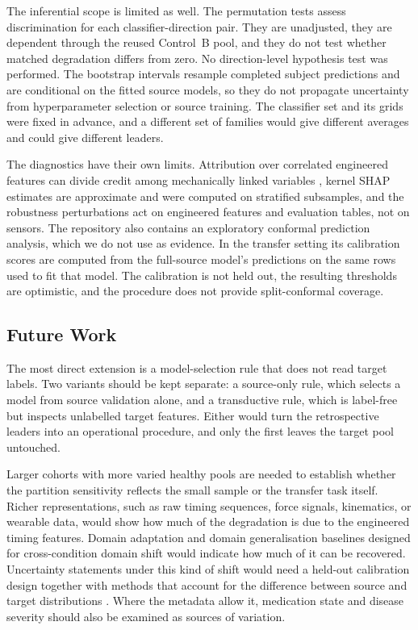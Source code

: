 \documentclass[conference]{IEEEtran}
\begin{document}
The inferential scope is limited as well. The permutation tests assess discrimination for each classifier-direction pair. They are unadjusted, they are dependent through the reused Control~B pool, and they do not test whether matched degradation differs from zero. No direction-level hypothesis test was performed. The bootstrap intervals resample completed subject predictions and are conditional on the fitted source models, so they do not propagate uncertainty from hyperparameter selection or source training. The classifier set and its grids were fixed in advance, and a different set of families would give different averages and could give different leaders.

The diagnostics have their own limits. Attribution over correlated engineered features can divide credit among mechanically linked variables \cite{aas2021dependentshap}, kernel SHAP estimates are approximate and were computed on stratified subsamples, and the robustness perturbations act on engineered features and evaluation tables, not on sensors. The repository also contains an exploratory conformal prediction analysis, which we do not use as evidence. In the transfer setting its calibration scores are computed from the full-source model's predictions on the same rows used to fit that model. The calibration is not held out, the resulting thresholds are optimistic, and the procedure does not provide split-conformal coverage.

\subsection{Future Work}
The most direct extension is a model-selection rule that does not read target labels. Two variants should be kept separate: a source-only rule, which selects a model from source validation alone, and a transductive rule, which is label-free but inspects unlabelled target features. Either would turn the retrospective leaders into an operational procedure, and only the first leaves the target pool untouched.

Larger cohorts with more varied healthy pools are needed to establish whether the partition sensitivity reflects the small sample or the transfer task itself. Richer representations, such as raw timing sequences, force signals, kinematics, or wearable data, would show how much of the degradation is due to the engineered timing features. Domain adaptation and domain generalisation baselines designed for cross-condition domain shift would indicate how much of it can be recovered. Uncertainty statements under this kind of shift would need a held-out calibration design together with methods that account for the difference between source and target distributions \cite{angelopoulos2021conformal,tibshirani2019conformalshift}. Where the metadata allow it, medication state and disease severity should also be examined as sources of variation.
\end{document}
